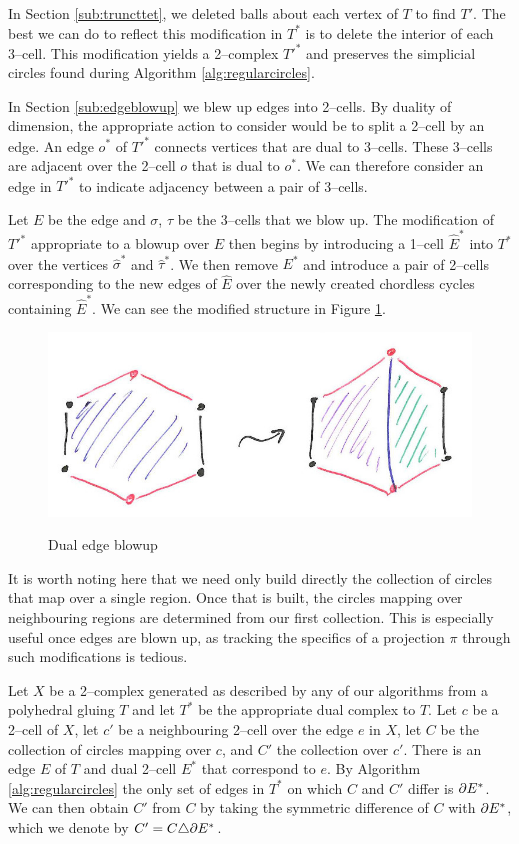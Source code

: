 In Section \ref{sub:truncttet}, we deleted balls about each vertex of $T$ to find $T'$.
The best we can do to reflect this modification in $T^*$ is to delete the interior of each 3--cell.
This modification yields a 2--complex $T'^*$ and preserves the simplicial circles found during Algorithm \ref{alg:regularcircles}.

In Section \ref{sub:edgeblowup} we blew up edges into 2--cells.
By duality of dimension, the appropriate action to consider would be to split a 2--cell by an edge.
An edge $o^*$ of $T'^*$ connects vertices that are dual to 3--cells.
These 3--cells are adjacent over the 2--cell $o$ that is dual to $o^*$.
We can therefore consider an edge in $T'^*$ to indicate adjacency between a pair of 3--cells.

Let $E$ be the edge and $\sigma$, $\tau$ be the 3--cells that we blow up.
The modification of $T'^*$ appropriate to a blowup over $E$ then begins by introducing a 1--cell $\hat{E}^*$ into $T^*$ over the vertices $\hat{\sigma}^*$ and $\hat{\tau}^*$.
We then remove $E^*$ and introduce a pair of 2--cells corresponding to the new edges of $\hat{E}$ over the newly created chordless cycles containing $\hat{E}^*$.
We can see the modified structure in Figure \ref{fig:dualblowup}.

\begin{figure}
	\centering
	\captionsetup{justification=centering}
	\caption{Dual edge blowup}
	\includegraphics[width=5.5in]{figures/dualblowup.jpg}
	\label{fig:dualblowup}
\end{figure}

It is worth noting here that we need only build directly the collection of circles that map over a single region.
Once that is built, the circles mapping over neighbouring regions are determined from our first collection.
This is especially useful once edges are blown up, as tracking the specifics of a projection $\pi$ through such modifications is tedious.

Let $X$ be a 2--complex generated as described by any of our algorithms from a polyhedral gluing $T$ and let $T^*$ be the appropriate dual complex to $T$.
Let $c$ be a 2--cell of $X$, let $c'$ be a neighbouring 2--cell over the edge $e$ in $X$, let $C$ be the collection of circles mapping over $c$, and $C'$ the collection over $c'$.
There is an edge $E$ of $T$ and dual 2--cell $E^*$ that correspond to $e$.
By Algorithm \ref{alg:regularcircles} the only set of edges in $T^*$ on which $C$ and $C'$ differ is $\partial E^*$.
We can then obtain $C'$ from $C$ by taking the symmetric difference of $C$ with $\partial E^*$, which we denote by $C'=C\triangle \partial E^*$.